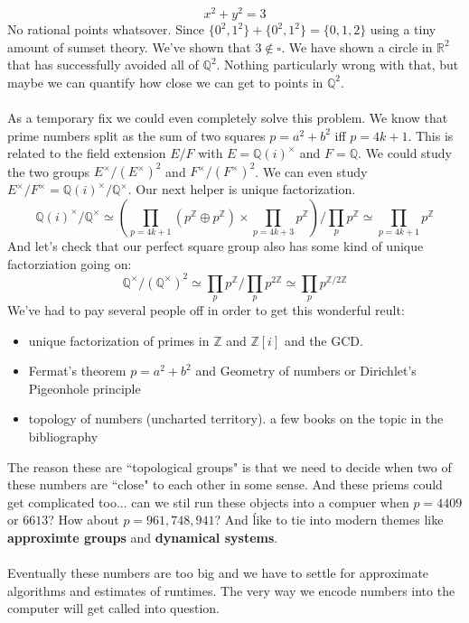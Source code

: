 \documentclass[12pt]{article}
\begin{document}
$$ x^2 + y^2 = 3 $$
No rational points whatsover.  Since $\{ 0^2, 1^2\} + \{ 0^2 , 1^2 \}  = \{ 0,1,2\}$ using a tiny amount of sumset theory.  We've shown that $3 \notin \square$.  We have shown a circle in $\mathbb{R}^2$ that has successfully avoided all of $\mathbb{Q}^2$.  Nothing particularly wrong with that, but maybe we can quantify how close  we can get to points in $\mathbb{Q}^2$. \\ \\
As a temporary fix we could even completely solve this problem.  We know that prime numbers split as the sum of two squares $p = a^2 + b^2$ iff $p = 4k+1$.  This is related to the field extension $E/F$ with $E = \mathbb{Q}(i)^\times$ and $F = \mathbb{Q}$.  We could study the two groups $E^\times /(E^\times)^2$ and $F^\times/(F^\times)^2$.  We can even study $E^\times / F^\times  = \mathbb{Q}(i)^\times/\mathbb{Q}^\times$.  Our next helper is unique factorization.  
$$ \mathbb{Q}(i)^\times / \mathbb{Q}^\times \simeq 
\left( \prod_{p = 4k+1} (p^\mathbb{Z}\oplus p^\mathbb{Z}) \times \prod_{p = 4k+3} p^\mathbb{Z} \right) / \prod_p p^\mathbb{Z} \simeq \prod_{p = 4k+1} p^\mathbb{Z}$$
And let's check that our perfect square group also has some kind of unique factorziation going on:
$$ \mathbb{Q}^\times/(\mathbb{Q}^\times)^2 \simeq \prod_p p^\mathbb{Z} / \prod_p p^{2\mathbb{Z}} \simeq \prod_p p^{\mathbb{Z}/2\mathbb{Z}} $$
We've had to pay several people off in order to get this wonderful reult:
\begin{itemize}
\item unique factorization of primes in $\mathbb{Z}$ and $\mathbb{Z}[i]$ and the GCD.
\item Fermat's theorem $p = a^2 + b^2$ and Geometry of numbers or Dirichlet's Pigeonhole principle
\item topology of numbers (uncharted territory).  a few books on the topic in the bibliography
\end{itemize}
The reason these are ``topological groups" is that we need to decide when two of these numbers are ``close" to each other in some sense.  And these priems could get complicated too... can we stil run these objects into a compuer when $p = 4409$ or $6613$?  How about $p = 961,748,941$?  And ĺike to tie into modern themes like \textbf{approximte groups} and \textbf{dynamical systems}. \\ \\ Eventually these numbers are too big and we have to settle for approximate algorithms and estimates of runtimes.  The very way we encode numbers into the computer will get called into question.
\end{document}
